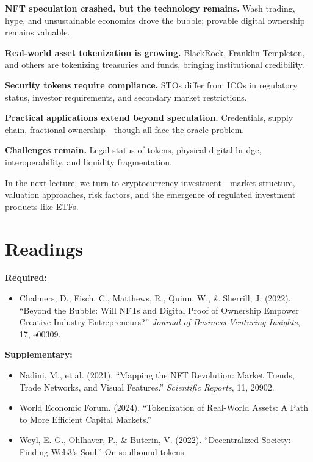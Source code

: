 \documentclass[11pt,a4paper]{article}
\begin{document}
\textbf{NFT speculation crashed, but the technology remains.} Wash trading, hype, and unsustainable economics drove the bubble; provable digital ownership remains valuable.

\textbf{Real-world asset tokenization is growing.} BlackRock, Franklin Templeton, and others are tokenizing treasuries and funds, bringing institutional credibility.

\textbf{Security tokens require compliance.} STOs differ from ICOs in regulatory status, investor requirements, and secondary market restrictions.

\textbf{Practical applications extend beyond speculation.} Credentials, supply chain, fractional ownership---though all face the oracle problem.

\textbf{Challenges remain.} Legal status of tokens, physical-digital bridge, interoperability, and liquidity fragmentation.

In the next lecture, we turn to cryptocurrency investment---market structure, valuation approaches, risk factors, and the emergence of regulated investment products like ETFs.

\section*{Readings}

\textbf{Required:}
\begin{itemize}
    \item Chalmers, D., Fisch, C., Matthews, R., Quinn, W., \& Sherrill, J. (2022). ``Beyond the Bubble: Will NFTs and Digital Proof of Ownership Empower Creative Industry Entrepreneurs?'' \textit{Journal of Business Venturing Insights}, 17, e00309.
\end{itemize}

\textbf{Supplementary:}
\begin{itemize}
    \item Nadini, M., et al. (2021). ``Mapping the NFT Revolution: Market Trends, Trade Networks, and Visual Features.'' \textit{Scientific Reports}, 11, 20902.
    \item World Economic Forum. (2024). ``Tokenization of Real-World Assets: A Path to More Efficient Capital Markets.''
    \item Weyl, E. G., Ohlhaver, P., \& Buterin, V. (2022). ``Decentralized Society: Finding Web3's Soul.'' On soulbound tokens.
\end{itemize}

\end{document}
